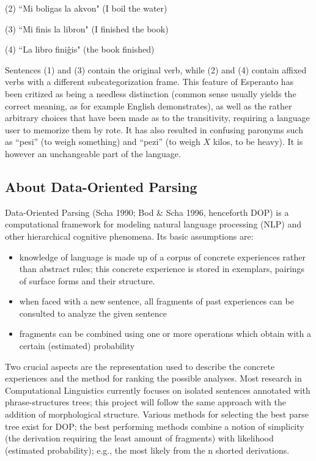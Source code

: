 \documentclass[10pt,a4paper]{article}
\begin{document}
(2) ``Mi boligas la akvon" (I boil the water)

(3) ``Mi finis la libron" (I finished the book)

(4) ``La libro fini\^gis" (the book finished)

Sentences (1) and (3) contain the original verb, while (2) and (4) contain
affixed verbs with a different subcategorization frame. This feature of
Esperanto has been critized as being a needless distinction (common sense
usually yields the correct meaning, as for example English demonstrates),
as well as the rather arbitrary choices that have been made as to the
transitivity, requiring a language user to memorize them by
rote. It has also resulted in confusing paronyms such as ``pesi'' (to weigh
something) and ``pezi'' (to weigh $X$ kilos, to be heavy). It is however an
unchangeable part of the language.

\subsection{About Data-Oriented Parsing}

Data-Oriented Parsing (Scha 1990; Bod \& Scha 1996, henceforth DOP) is a
computational framework for modeling natural language processing (NLP) and
other hierarchical cognitive phenomena. Its basic assumptions are:

\begin{itemize}
\item knowledge of language is made up of a corpus of concrete experiences
rather than abstract rules; this concrete experience is stored in
exemplars, pairings of surface forms and their structure.
\item when faced with a new sentence, all fragments of past experiences can be
consulted to analyze the given sentence
\item fragments can be combined using one or more operations which obtain with a
certain (estimated) probability
\end{itemize}

Two crucial aspects are the representation used to describe the concrete
experiences and the method for ranking the possible analyses. Most research in
Computational Linguistics currently focuses on isolated sentences annotated
with phrase-structures trees; this project will follow the same approach with
the addition of morphological structure. Various methods for selecting the best
parse tree exist for DOP; the best performing methods combine a notion of
simplicity (the derivation requiring the least amount of fragments) with
likelihood (estimated probability); e.g., the most likely from the n shorted
derivations.
\end{document}

